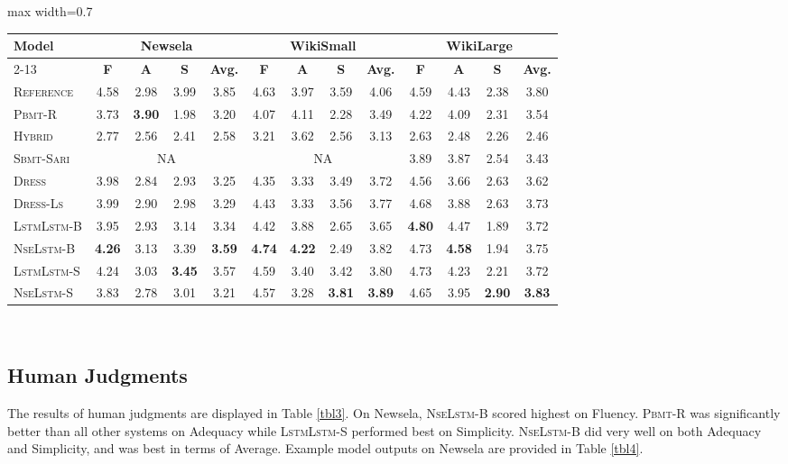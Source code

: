 \documentclass[11pt,a4paper]{article}
\begin{document}
\begin{table*}[ht]
\centering
\begin{adjustbox}{max width=0.7\textwidth}
\begin{tabular}{| l | c c c c | c c c c | c c c c |} 
 \hline
\multirow{2}{*}{\textbf{Model}} & \multicolumn{4}{|c|}{\textbf{Newsela}}  & \multicolumn{4}{|c|}{\textbf{WikiSmall}} & \multicolumn{4}{|c|}{\textbf{WikiLarge}} \\[0.2ex] 
 \cline{2-13}
& \textbf{F} & \textbf{A}  & \textbf{S} & \textbf{Avg.}  & \textbf{F} & \textbf{A}  & \textbf{S} & \textbf{Avg.}  &
\textbf{F} & \textbf{A}  & \textbf{S} & \textbf{Avg.}  \\
 \hline\hline
 \textsc{Reference} 
&4.58	&2.98	&3.99	&3.85 &4.63	&3.97	&3.59	&4.06 &4.59	&4.43	&2.38	&3.80 \\
  \hline\hline
 \textsc{Pbmt-R} &3.73	&\textbf{3.90}	&1.98	&3.20 &4.07	&4.11	&2.28	&3.49 &4.22	&4.09	&2.31	&3.54 \\
  \textsc{Hybrid} &2.77	&2.56	&2.41	&2.58 &3.21	&3.62	&2.56	&3.13 &2.63	&2.48	&2.26	&2.46 \\
 \textsc{Sbmt-Sari} &\multicolumn{4}{|c|}{{NA}} & \multicolumn{4}{|c|}{{NA}} &3.89	&3.87	&2.54	&3.43 \\
 \textsc{Dress} &3.98	&2.84	&2.93	&3.25 &4.35	&3.33	&3.49	&3.72 &4.56	&3.66	&2.63	&3.62 \\
 \textsc{Dress-Ls} &3.99	&2.90	&2.98	&3.29 &4.43	&3.33	&3.56	&3.77 &4.68	&3.88	&2.63	&3.73 \\
  \hline\hline
  \textsc{LstmLstm-B} &3.95	&2.93	&3.14	&3.34 & 4.42	&3.88	&2.65	&3.65 &\textbf{4.80}	&4.47	&1.89	&3.72 \\
 \textsc{NseLstm-B} &\textbf{4.26}	&3.13	&3.39	&\textbf{3.59} &\textbf{4.74}	&\textbf{4.22}	&2.49	&3.82 &4.73	&\textbf{4.58}	&1.94	&3.75 \\
   \hline\hline
  \textsc{LstmLstm-S} &4.24	&3.03	&\textbf{3.45} &3.57  &4.59	&3.40	&3.42	&3.80 &4.73	&4.23	&2.21	&3.72 \\
 \textsc{NseLstm-S} &3.83	&2.78	&3.01	&3.21 & 4.57	&3.28	&\textbf{3.81}	&\textbf{3.89} &4.65	&3.95	&\textbf{2.90} &\textbf{3.83} \\

 \hline
\end{tabular}\end{adjustbox}
\\[3mm]
\caption{Average human ratings (Fluency (F), Adequacy (A),  Simplicity (S), and Average (Avg.)).}
\label{tbl3}
\end{table*}
\subsection{Human Judgments}
The results of human judgments are displayed in Table \ref{tbl3}. On Newsela, \textsc{NseLstm-B} scored highest on Fluency. \textsc{Pbmt-R} was significantly better than all other systems on Adequacy while \textsc{LstmLstm-S} performed best on Simplicity. \textsc{NseLstm-B} did very well on both Adequacy and Simplicity, and was best in terms of Average. Example model outputs on Newsela are provided in Table \ref{tbl4}. 
\end{document}
